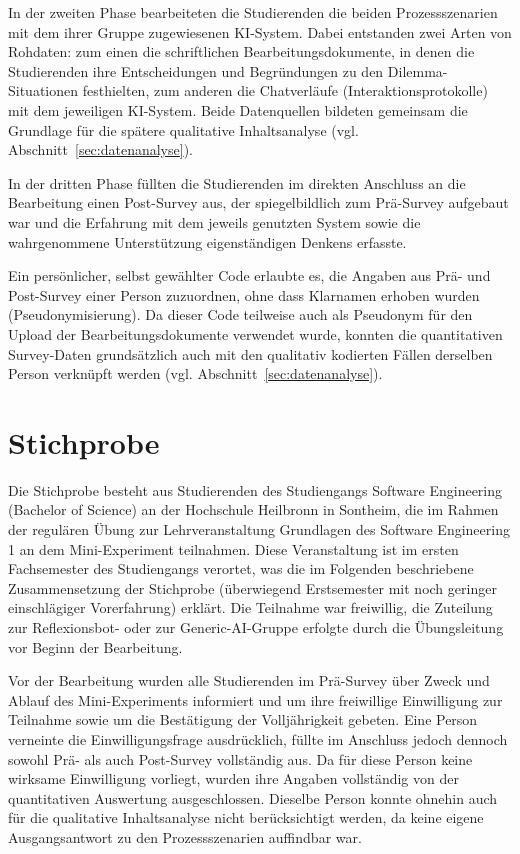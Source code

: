 In der zweiten Phase bearbeiteten die Studierenden die beiden Prozessszenarien mit dem ihrer Gruppe
zugewiesenen KI-System. Dabei entstanden zwei Arten von Rohdaten: zum einen die schriftlichen
Bearbeitungsdokumente, in denen die Studierenden ihre Entscheidungen und Begründungen zu den
Dilemma-Situationen festhielten, zum anderen die Chatverläufe (Interaktionsprotokolle) mit dem
jeweiligen KI-System. Beide Datenquellen bildeten gemeinsam die Grundlage für die spätere qualitative
Inhaltsanalyse (vgl. Abschnitt~\ref{sec:datenanalyse}).

In der dritten Phase füllten die Studierenden im direkten Anschluss an die Bearbeitung einen
Post-Survey aus, der spiegelbildlich zum Prä-Survey aufgebaut war und die Erfahrung mit dem jeweils
genutzten System sowie die wahrgenommene Unterstützung eigenständigen Denkens erfasste.

Ein persönlicher, selbst gewählter Code erlaubte es, die Angaben aus Prä- und Post-Survey einer Person
zuzuordnen, ohne dass Klarnamen erhoben wurden (Pseudonymisierung). Da dieser Code
teilweise auch als Pseudonym für den Upload der Bearbeitungsdokumente verwendet wurde, konnten die
quantitativen Survey-Daten grundsätzlich auch mit den qualitativ kodierten Fällen derselben Person
verknüpft werden (vgl. Abschnitt~\ref{sec:datenanalyse}).

\section{Stichprobe}
\label{sec:stichprobe}
Die Stichprobe besteht aus Studierenden des Studiengangs Software Engineering (Bachelor of Science) an
der Hochschule Heilbronn in Sontheim, die im Rahmen der regulären Übung zur Lehrveranstaltung \glqq
Grundlagen des Software Engineering 1\grqq{} an dem Mini-Experiment teilnahmen. Diese Veranstaltung ist
im ersten Fachsemester des Studiengangs verortet, was die im Folgenden beschriebene Zusammensetzung der
Stichprobe (überwiegend Erstsemester mit noch geringer einschlägiger Vorerfahrung) erklärt. Die
Teilnahme war freiwillig, die Zuteilung zur Reflexionsbot- oder zur Generic-AI-Gruppe erfolgte durch
die Übungsleitung vor Beginn der Bearbeitung.

Vor der Bearbeitung wurden alle Studierenden im Prä-Survey über Zweck und Ablauf des Mini-Experiments
informiert und um ihre freiwillige Einwilligung zur Teilnahme sowie um die Bestätigung der
Volljährigkeit gebeten. Eine Person verneinte die Einwilligungsfrage ausdrücklich, füllte im Anschluss
jedoch dennoch sowohl Prä- als auch Post-Survey vollständig aus. Da für diese Person keine wirksame
Einwilligung vorliegt, wurden ihre Angaben vollständig von der quantitativen Auswertung ausgeschlossen.
Dieselbe Person konnte ohnehin auch für die qualitative Inhaltsanalyse nicht berücksichtigt werden, da
keine eigene Ausgangsantwort zu den Prozessszenarien auffindbar war.


